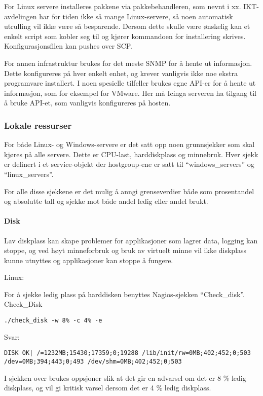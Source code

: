 For Linux servere installeres pakkene via pakkebehandleren, som nevnt i xx. IKT-avdelingen har for tiden ikke så mange Linux-servere, så noen automatisk utrulling vil ikke være så besparende. Dersom dette skulle være ønskelig kan et enkelt script som kobler seg til og kjører kommandoen for installering skrives. Konfigurasjonsfilen kan pushes over SCP.

For annen infrastruktur brukes for det meste SNMP for å hente ut informasjon. Dette konfigureres på hver enkelt enhet, og krever vanligvis ikke noe ekstra programvare installert. I noen spesielle tilfeller brukes egne API-er for å hente ut informasjon, som for eksempel for VMware. Her må Icinga serveren ha tilgang til å bruke API-et, som vanligvis konfigureres på hosten.

\subsubsection{Lokale ressurser}
For både Linux- og Windows-servere er det satt opp noen grunnsjekker som skal kjøres på alle servere. Dette er CPU-last, harddiskplass og minnebruk. Hver sjekk er definert i et service-objekt der hostgroup-ene er satt til “windows\_servers” og “linux\_servers”. 

For alle disse sjekkene er det mulig å anngi grenseverdier både som prosentandel og absolutte tall og sjekke mot både andel ledig eller andel brukt. 
\paragraph{Disk}
Lav diskplass kan skape problemer for applikasjoner som lagrer data, logging kan stoppe, og ved høyt minneforbruk og bruk av virtuelt minne vil ikke diskplass kunne utnyttes og applikasjoner kan stoppe å fungere.

Linux:

For å sjekke ledig plass på harddisken benyttes Nagios-sjekken “Check\_disk”. 
Check\_Disk
\begin{lstlisting}
./check_disk -w 8% -c 4% -e
\end{lstlisting}
Svar: 
\begin{lstlisting}
DISK OK| /=1232MB;15430;17359;0;19288 /lib/init/rw=0MB;402;452;0;503 /dev=0MB;394;443;0;493 /dev/shm=0MB;402;452;0;503
\end{lstlisting}
I sjekken over brukes oppsjoner slik at det gir en advarsel om det er 8 \% ledig diskplass, og vil gi kritisk varsel dersom det er 4 \% ledig diskplass.

